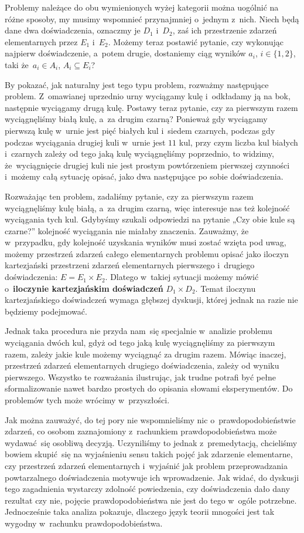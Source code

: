 \documentclass[a4paper,11pt]{article}
\numberwithin{equation}{section}
\begin{document}
Problemy należące do obu wymienionych wyżej kategorii można uogólnić na
różne sposoby, my musimy wspomnieć przynajmniej o~jednym z~nich. Niech będą
dane dwa doświadczenia, oznaczmy je $D_{ 1 }$ i~$D_{ 2 }$, zaś ich
przestrzenie zdarzeń elementarnych przez $E_{ 1 }$ i~$E_{ 2 }$. Możemy teraz postawić pytanie, czy wykonując najpierw doświadczenie, a~potem drugie,
dostaniemy ciąg wyników $a_{ i }$, $i \in \{ 1, 2 \}$, taki
że~$a_{ i } \in A_{ i }$, $A_{ i } \subseteq E_{ i }$?

By pokazać, jak naturalny jest tego typu problem, rozważmy następujące
problem. Z~omawianej uprzednio urny wyciągamy kulę i~odkładamy ją na bok,
następnie wyciągamy drugą kulę. Postawy teraz pytanie, czy za pierwszym
razem wyciągnęliśmy białą kulę, a~za drugim czarną? Ponieważ
gdy wyciągamy pierwszą kulę w~urnie jest pięć białych kul i~siedem czarnych,
podczas gdy podczas wyciągania drugiej kuli w~urnie jest $11$ kul, przy czym
liczba kul białych i~czarnych zależy od tego jaką kulę wyciągnęliśmy
poprzednio, to widzimy, że~wyciągnięcie drugiej kuli nie jest prostym
powtórzeniem pierwszej czynności i~możemy całą sytuację opisać, jako dwa
następujące po sobie doświadczenia.

Rozważając ten problem, zadaliśmy pytanie, czy za pierwszym razem
wyciągnęliśmy kulę białą, a~za drugim czarną, więc interesuje nas też
kolejność wyciągania tych kul. Gdybyśmy szukali odpowiedzi na pytanie „Czy
obie kule są czarne?” kolejność wyciągania nie miałaby znaczenia.
Zauważmy, że w~przypadku, gdy kolejność uzyskania wyników musi zostać wzięta
pod uwag, możemy przestrzeń zdarzeń całego elementarnych problemu opisać
jako iloczyn kartezjański przestrzeni zdarzeń elementarnych pierwszego
i~drugiego doświadczenia: $E = E_{ 1 } \times E_{ 2 }$. Dlatego w~takiej sytuacji
możemy mówić o~\textbf{iloczynie kartezjańskim doświadczeń}
$D_{ 1 } \times D_{ 2 }$. Temat iloczynu kartezjańskiego doświadczeń wymaga
głębszej dyskusji, której jednak na razie nie będziemy podejmować.

Jednak taka procedura nie przyda nam~się specjalnie w~analizie problemu
wyciągania dwóch kul, gdyż od tego jaką kulę wyciągnęliśmy za pierwszym
razem, zależy jakie kule możemy wyciągnąć za drugim razem. Mówiąc inaczej,
przestrzeń zdarzeń elementarnych drugiego doświadczenia, zależy od wyniku
pierwszego. Wszystko te rozważania ilustrując, jak trudne potrafi być
pełne sformalizowanie nawet bardzo prostych do opisania słowami
eksperymentów. Do problemów tych może wrócimy w~przyszłości.

Jak można zauważyć, do tej pory nie wspomnieliśmy nic o~prawdopodobieństwie
zdarzeń, co osobom zaznajomiony z~rachunkiem prawdopodobieństwa może
wydawać~się osobliwą decyzją. Uczyniliśmy to jednak z~premedytacją,
chcieliśmy bowiem skupić~się na wyjaśnieniu sensu takich pojęć jak zdarzenie
elementarne, czy przestrzeń zdarzeń elementarnych i~wyjaśnić jak problem
przeprowadzania powtarzalnego doświadczenia motywuje ich wprowadzenie. Jak
widać, do dyskusji tego zagadnienia wystarczy zdolność powiedzenia, czy
doświadczenia dało dany rezultat czy nie, pojęcie prawdopodobieństwa nie
jest do tego w~ogóle potrzebne. Jednocześnie taka analiza pokazuje, dlaczego
język teorii mnogości jest tak wygodny w~rachunku prawdopodobieństwa.
\end{document}

